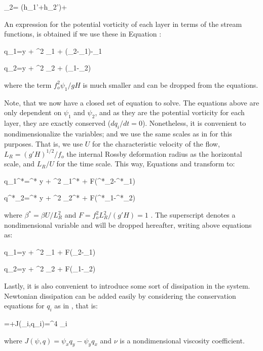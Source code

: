 \beq
\psi _2=  (h_1'+h_2')+

An expression for the potential vorticity of each layer in terms of the stream functions, is obtained if we use these in Equation :

\beq
q_1=\beta y + \nabla^2 \psi_1 + (\psi_2-\psi_1)-\psi_1

\beq
q_2=\beta y + \nabla^2 \psi_2 + (\psi_1-\psi_2)

where the term $f_o^2 \psi_1/gH$ is much smaller and can be dropped from the equations. 

Note, that we now have a closed set of equation to solve. The equations above are only dependent on $\psi_1$ and $\psi_2$, and as they are the potential vorticity for each layer, they are exactly conserved ($d q_i/dt=0$). Nonetheless, it is convenient to nondimensionalize the variables; and we use the same scales as in  for this purposes. That is, we use $U$ for the characteristic velocity of the flow, $L_R=(g'H)^{1/2}/f_o$ the internal Rossby deformation radius as the horizontal scale, and $L_R/U$ for the time scale. This way, Equations  and  transform to:

\beq
q_1^*=\beta^* y + \nabla^2 \psi_1^* + F(\psi^*_2-\psi^*_1)

\beq
q^*_2=\beta^* y + \nabla^2 \psi_2^* + F(\psi^*_1-\psi^*_2)

where $\beta^*=\beta U / L_R^2$ and $F=f_o^2 L_R^2 /(g'H) = 1$ . The superscript denotes a nondimensional variable and will be dropped hereafter, writing above equations as:

\beq
q_1=\beta y + \nabla^2 \psi_1 + F(\psi_2-\psi_1)

\beq
q_2=\beta y + \nabla^2 \psi_2 + F(\psi_1-\psi_2)

Lastly, it is also convenient to introduce some sort of dissipation in the system. Newtonian dissipation can be added easily by considering the conservation equations for $q_i$ as in , that is:

\beq
{}=+J(\psi_i,q_i)=\nu \nabla^4 \psi_i

where $J(\psi,q)=\psi_x q_y - \psi_y q_x$ and $\nu$ is a nondimensional viscosity coefficient.

